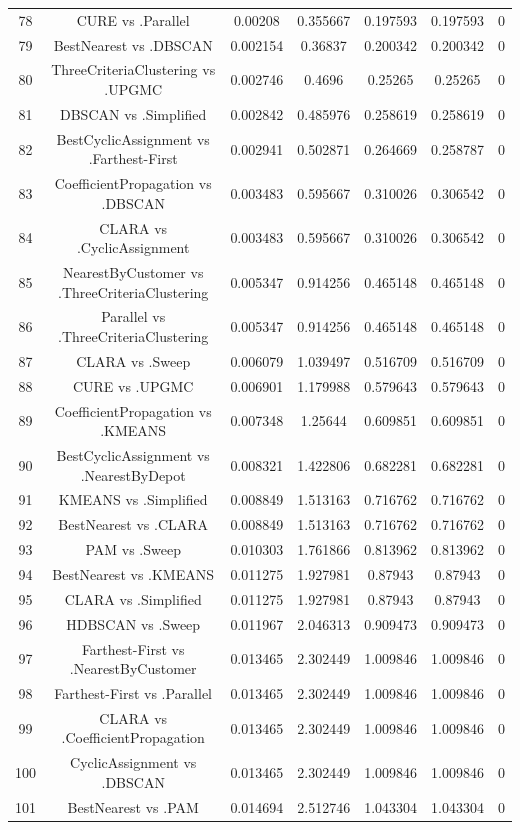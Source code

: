 \documentclass[a4paper,10pt]{article}
\begin{document}
\begin{landscape}
\begin{table}[!htp]
\begin{tabular}{ccccccc}
78&CURE vs .Parallel&0.00208&0.355667&0.197593&0.197593&0\\
79&BestNearest vs .DBSCAN&0.002154&0.36837&0.200342&0.200342&0\\
80&ThreeCriteriaClustering vs .UPGMC&0.002746&0.4696&0.25265&0.25265&0\\
81&DBSCAN vs .Simplified&0.002842&0.485976&0.258619&0.258619&0\\
82&BestCyclicAssignment vs .Farthest-First&0.002941&0.502871&0.264669&0.258787&0\\
83&CoefficientPropagation vs .DBSCAN&0.003483&0.595667&0.310026&0.306542&0\\
84&CLARA vs .CyclicAssignment&0.003483&0.595667&0.310026&0.306542&0\\
85&NearestByCustomer vs .ThreeCriteriaClustering&0.005347&0.914256&0.465148&0.465148&0\\
86&Parallel vs .ThreeCriteriaClustering&0.005347&0.914256&0.465148&0.465148&0\\
87&CLARA vs .Sweep&0.006079&1.039497&0.516709&0.516709&0\\
88&CURE vs .UPGMC&0.006901&1.179988&0.579643&0.579643&0\\
89&CoefficientPropagation vs .KMEANS&0.007348&1.25644&0.609851&0.609851&0\\
90&BestCyclicAssignment vs .NearestByDepot&0.008321&1.422806&0.682281&0.682281&0\\
91&KMEANS vs .Simplified&0.008849&1.513163&0.716762&0.716762&0\\
92&BestNearest vs .CLARA&0.008849&1.513163&0.716762&0.716762&0\\
93&PAM vs .Sweep&0.010303&1.761866&0.813962&0.813962&0\\
94&BestNearest vs .KMEANS&0.011275&1.927981&0.87943&0.87943&0\\
95&CLARA vs .Simplified&0.011275&1.927981&0.87943&0.87943&0\\
96&HDBSCAN vs .Sweep&0.011967&2.046313&0.909473&0.909473&0\\
97&Farthest-First vs .NearestByCustomer&0.013465&2.302449&1.009846&1.009846&0\\
98&Farthest-First vs .Parallel&0.013465&2.302449&1.009846&1.009846&0\\
99&CLARA vs .CoefficientPropagation&0.013465&2.302449&1.009846&1.009846&0\\
100&CyclicAssignment vs .DBSCAN&0.013465&2.302449&1.009846&1.009846&0\\
101&BestNearest vs .PAM&0.014694&2.512746&1.043304&1.043304&0\\

\end{tabular}
\end{table}
\end{landscape}
\end{document}
